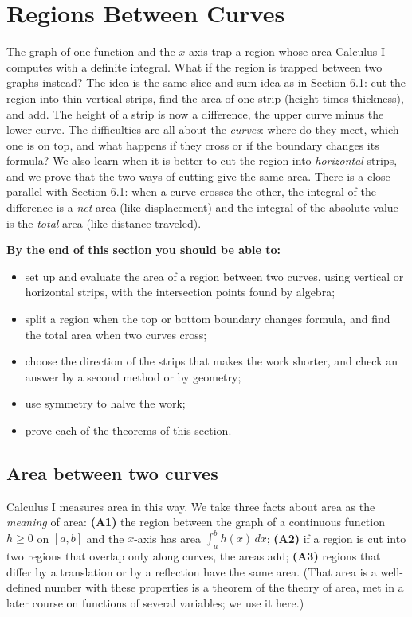\documentclass[11pt]{article}
\begin{document}
\section{Regions Between Curves}

\begin{guide}
The graph of one function and the $x$-axis trap a region whose area Calculus I computes with a definite integral. What if the region is trapped between two graphs instead? The idea is the same slice-and-sum idea as in Section 6.1: cut the region into thin vertical strips, find the area of one strip (height times thickness), and add. The height of a strip is now a difference, the upper curve minus the lower curve. The difficulties are all about the \emph{curves}: where do they meet, which one is on top, and what happens if they cross or if the boundary changes its formula? We also learn when it is better to cut the region into \emph{horizontal} strips, and we prove that the two ways of cutting give the same area. There is a close parallel with Section 6.1: when a curve crosses the other, the integral of the difference is a \emph{net} area (like displacement) and the integral of the absolute value is the \emph{total} area (like distance traveled).
\end{guide}

\textbf{By the end of this section you should be able to:}
\begin{itemize}
  \item set up and evaluate the area of a region between two curves, using vertical or horizontal strips, with the intersection points found by algebra;
  \item split a region when the top or bottom boundary changes formula, and find the total area when two curves cross;
  \item choose the direction of the strips that makes the work shorter, and check an answer by a second method or by geometry;
  \item use symmetry to halve the work;
  \item prove each of the theorems of this section.
\end{itemize}

\subsection*{Area between two curves}

Calculus I measures area in this way. We take three facts about area as the \emph{meaning} of area: \textbf{(A1)} the region between the graph of a continuous function $h\ge0$ on $[a,b]$ and the $x$-axis has area $\int_a^bh(x)\,dx$; \textbf{(A2)} if a region is cut into two regions that overlap only along curves, the areas add; \textbf{(A3)} regions that differ by a translation or by a reflection have the same area. (That area is a well-defined number with these properties is a theorem of the theory of area, met in a later course on functions of several variables; we use it here.)
\end{document}
